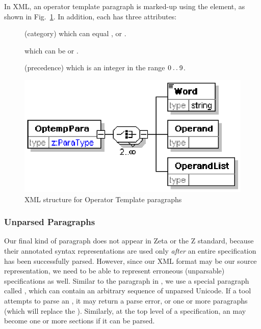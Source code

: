 \documentclass{llncs}  %
\newcommand{\Zeta}{Zeta}
\begin{document}
In XML, an operator template paragraph is marked-up using
the  element, as shown in Fig.~\ref{fig:optemppara}.
In addition, each  has three attributes:
\begin{description}
\item[] (category) which can equal ,
   or .  
\item[] which can be  or . 
\item[] (precedence) which is an integer in the range $0 \mathbin{\mathstrut{\ldotp\ldotp}}
  9$.
\end{description}

\begin{figure}[htbp]
  \centering
  \includegraphics{optemppara.eps}
  \caption{XML structure for Operator Template paragraphs}
  \label{fig:optemppara}
\end{figure}


\subsubsection{Unparsed Paragraphs}

Our final kind of paragraph does not appear in {\Zeta}
or the Z standard, because their annotated syntax representations
are used only \emph{after} an entire specification has been successfully
parsed.  However, since our XML format may be our source representation,
we need to be able to represent erroneous (unparsable) specifications as
well.  Similar to the  paragraph in \CADiZ, we use a
special paragraph called , which can contain an
arbitrary sequence of unparsed Unicode.  If a tool attempts to parse
an , it may return a parse error, or one or more
paragraphs (which will replace the ).  Similarly,
at the top level of a specification, an  may become
one or more sections if it can be parsed.
\end{document}
